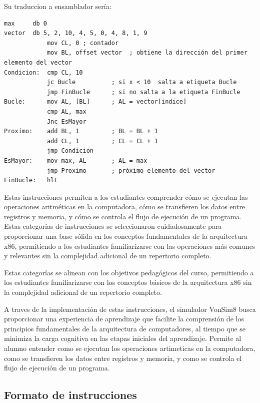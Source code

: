 \documentclass[12pt,oneside]{templates/unerthesis}
\begin{document}
Su traduccion a ensamblador sería:

\begin{lstlisting}
max     db 0
vector  db 5, 2, 10, 4, 5, 0, 4, 8, 1, 9
            mov CL, 0 ; contador
            mov BL, offset vector  ; obtiene la dirección del primer elemento del vector
Condicion:  cmp CL, 10 
            jc Bucle          ; si x < 10  salta a etiqueta Bucle
            jmp FinBucle      ; si no salta a la etiqueta FinBucle
Bucle:      mov AL, [BL]      ; AL = vector[indice] 
            cmp AL, max
            Jnc EsMayor
Proximo:    add BL, 1         ; BL = BL + 1 
            add CL, 1         ; CL = CL + 1            
            jmp Condicion 
EsMayor:    mov max, AL       ; AL = max 
            jmp Proximo       ; próximo elemento del vector
FinBucle:   hlt\end{lstlisting}

Estas instrucciones permiten a los estudiantes comprender cómo se ejecutan las operaciones aritméticas en la computadora, cómo se transfieren los datos entre registros y memoria, y cómo se controla el flujo de ejecución de un programa.
Estas categorías de instrucciones se seleccionaron cuidadosamente para proporcionar una base sólida en los conceptos fundamentales de la arquitectura x86, permitiendo a los estudiantes familiarizarse con las operaciones más comunes y relevantes sin la complejidad adicional de un repertorio completo.

Estas categorías se alinean con los objetivos pedagógicos del curso, permitiendo a los estudiantes familiarizarse con los conceptos básicos de la arquitectura x86 sin la complejidad adicional de un repertorio completo.

A traves de la implementación de estas instrucciones, el simulador VonSim8 busca proporcionar una experiencia de aprendizaje que facilite la comprensión de los principios fundamentales de la arquitectura de computadores, al tiempo que se minimiza la carga cognitiva en las etapas iniciales del aprendizaje. Permite al alumno entender como se ejecutan los operaciones artimeticas en la computadora, como se transfieren los datos entre registros y memoria, y como se controla el flujo de ejecución de un programa.

\hypertarget{formato-de-instrucciones}{%
\subsection{Formato de instrucciones}\label{formato-de-instrucciones}}
\end{document}
